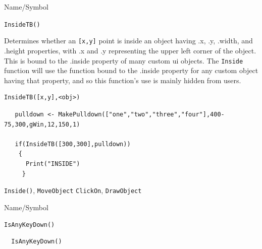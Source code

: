 \begin{desc}{Name/Symbol}
\item[Name/Symbol]	\verb+InsideTB()+

\item[Description] Determines whether an \verb+[x,y]+ point is inside an object having .x, .y, .width, and .height properties, with .x and .y representing the upper left corner of the object.  This is bound to the .inside property of many custom ui objects.  The \texttt{Inside} function will use the function bound to the .inside property for any custom object having that property, and so this function's use is mainly hidden from users.

\item[Usage]
\begin{verbatim}
InsideTB([x,y],<obj>)	
\end{verbatim}

\item[Example]	

\begin{verbatim}
   pulldown <- MakePulldown(["one","two","three","four"],400-75,300,gWin,12,150,1)

   if(InsideTB([300,300],pulldown))
    {
      Print("INSIDE")
     }
\end{verbatim}

\item[See Also]	
\verb+Inside()+, \verb+MoveObject+ \verb+ClickOn+, \verb+DrawObject+

\end{desc}


\begin{desc}{Name/Symbol}
\item[Name/Symbol]	\verb+IsAnyKeyDown()+

\item[Description]	

\item[Usage]		
\begin{verbatim}
  IsAnyKeyDown()
\end{verbatim}

\item[Example]	

\item[See Also]	
\end{desc}

